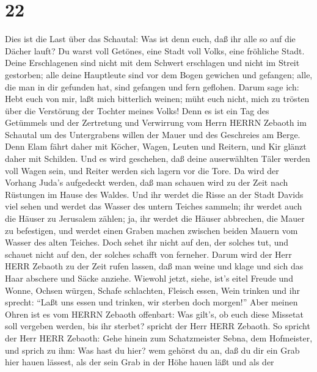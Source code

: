 \hypertarget{section-21}{%
\section{22}\label{section-21}}

 Dies ist die Last über das Schautal: Was ist denn euch, daß
ihr alle so auf die Dächer lauft?  Du warst voll Getönes,
eine Stadt voll Volks, eine fröhliche Stadt. Deine Erschlagenen sind
nicht mit dem Schwert erschlagen und nicht im Streit gestorben;
 alle deine Hauptleute sind vor dem Bogen gewichen und
gefangen; alle, die man in dir gefunden hat, sind gefangen und fern
geflohen.  Darum sage ich: Hebt euch von mir, laßt mich
bitterlich weinen; müht euch nicht, mich zu trösten über die Verstörung
der Tochter meines Volks!  Denn es ist ein Tag des Getümmels
und der Zertretung und Verwirrung vom Herrn HERRN Zebaoth im Schautal um
des Untergrabens willen der Mauer und des Geschreies am Berge.
 Denn Elam fährt daher mit Köcher, Wagen, Leuten und
Reitern, und Kir glänzt daher mit Schilden.  Und es wird
geschehen, daß deine auserwählten Täler werden voll Wagen sein, und
Reiter werden sich lagern vor die Tore.  Da wird der Vorhang
Juda's aufgedeckt werden, daß man schauen wird zu der Zeit nach
Rüstungen im Hause des Waldes.  Und ihr werdet die Risse an
der Stadt Davids viel sehen und werdet das Wasser des untern Teiches
sammeln;  ihr werdet auch die Häuser zu Jerusalem zählen;
ja, ihr werdet die Häuser abbrechen, die Mauer zu befestigen,
 und werdet einen Graben machen zwischen beiden Mauern vom
Wasser des alten Teiches. Doch sehet ihr nicht auf den, der solches tut,
und schauet nicht auf den, der solches schafft von ferneher.
 Darum wird der Herr HERR Zebaoth zu der Zeit rufen lassen,
daß man weine und klage und sich das Haar abschere und Säcke anziehe.
 Wiewohl jetzt, siehe, ist's eitel Freude und Wonne, Ochsen
würgen, Schafe schlachten, Fleisch essen, Wein trinken und ihr sprecht:
``Laßt uns essen und trinken, wir sterben doch morgen!'' 
Aber meinen Ohren ist es vom HERRN Zebaoth offenbart: Was gilt's, ob
euch diese Missetat soll vergeben werden, bis ihr sterbet? spricht der
Herr HERR Zebaoth.  So spricht der Herr HERR Zebaoth: Gehe
hinein zum Schatzmeister Sebna, dem Hofmeister, und sprich zu ihm:
 Was hast du hier? wem gehörst du an, daß du dir ein Grab
hier hauen lässest, als der sein Grab in der Höhe hauen läßt und als der
